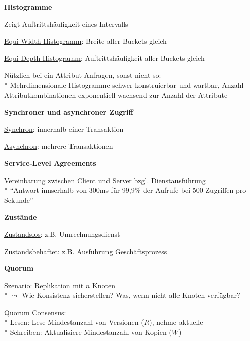 \textbf{Histogramme}
\begin{items}
	\item Zeigt Auftrittshäufigkeit eines Intervalls
	\item \underline{Equi-Width-Histogramm}: Breite aller Buckets gleich
	\item \underline{Equi-Depth-Histogramm}: Auftrittshäufigkeit aller Buckets gleich
	\item Nützlich bei ein-Attribut-Anfragen, sonst nicht so:
		\\*
		Mehrdimensionale Histogramme schwer konstruierbar und wartbar, Anzahl Attributkombinationen exponentiell wachsend zur Anzahl der Attribute
\end{items}

\textbf{Synchroner und asynchroner Zugriff}
\begin{items}
	\item \underline{Synchron}: innerhalb einer Transaktion
	\item \underline{Asynchron}: mehrere Transaktionen
\end{items}

\textbf{Service-Level Agreements}
\begin{items}
	\item Vereinbarung zwischen Client und Server bzgl. Dienstausführung
		\\*
		``Antwort innserhalb von 300ms für 99,9\% der Aufrufe bei 500 Zugriffen pro Sekunde''
\end{items}

\textbf{Zustände}
\begin{items}
	\item \underline{Zustandslos}: z.B. Umrechnungsdienst
	\item \underline{Zustandsbehaftet}: z.B. Ausführung Geschäftsprozess
\end{items}

\textbf{Quorum}
\begin{items}
	\item Szenario: Replikation mit \( n \) Knoten
		\\*
		\( \leadsto \) Wie Konsistenz sicherstellen? Was, wenn nicht alle Knoten verfügbar?
	\item \underline{Quorum Consensus}:
		\\*
		Lesen: Lese Mindestanzahl von Versionen (\( R \)), nehme aktuelle
		\\*
		Schreiben: Aktualisiere Mindestanzahl von Kopien (\( W \))
\end{items}


